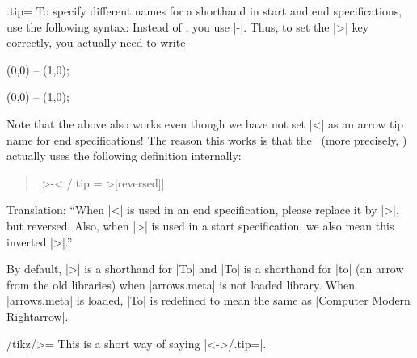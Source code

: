 \begin{handler}{{.tip}{=}}
    To specify different names for a shorthand in start and end specifications,
    use the following syntax: Instead of , you use |-|. Thus, to set the
    |>| key correctly, you actually need to write
\begin{codeexample}[preamble={\usetikzlibrary{arrows.meta}}]
\tikz [<-> /.tip = Stealth] \draw [<->>] (0,0) -- (1,0);
\end{codeexample}
\begin{codeexample}[preamble={\usetikzlibrary{arrows.meta}}]
\tikz [<-> /.tip = Latex] \draw [>-<] (0,0) -- (1,0);
\end{codeexample}

    Note that the above also works even though we have not set |<| as an arrow
    tip name for end specifications! The reason this works is that the
    \tikzname\ (more precisely, \pgfname) actually uses the following
    definition internally:
    \begin{quote}
        |>-< /.tip = >[reversed]|
    \end{quote}
    Translation: ``When |<| is used in an end specification, please replace it
    by |>|, but reversed. Also, when |>| is used in a start specification, we
    also mean this inverted |>|.''

    By default, |>| is a shorthand for |To| and |To| is a shorthand for |to|
    (an arrow from the old libraries) when |arrows.meta| is not loaded library.
    When |arrows.meta| is loaded, |To| is redefined to mean the same as
    |Computer Modern Rightarrow|.
\end{handler}

\begin{key}{/tikz/>=}
    This is a short way of saying |<->/.tip=|.
\begin{codeexample}[preamble={\usetikzlibrary{arrows.meta}}]
\begin{tikzpicture}[scale=2,ultra thick]
  \begin{scope}[>=Latex]
    \draw[>->]    (0pt,3ex) -- (1cm,3ex);
    \draw[|<->>|] (0pt,2ex) -- (1cm,2ex);
  \end{scope}
  \begin{scope}[>=Stealth]
    \draw[>->]    (0pt,1ex) -- (1cm,1ex);
    \draw[|<<.<->|] (0pt,0ex) -- (1cm,0ex);
  \end{scope}
\end{tikzpicture}
\end{codeexample}
\end{key}


